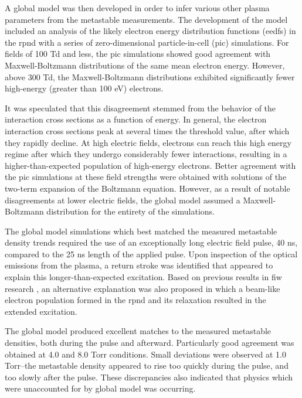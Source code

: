 A global model was then developed in order to infer various other plasma
parameters from the metastable measurements. The development of the model
included an analysis of the likely electron energy distribution functions
(\acs{eedf}s) in the \acs{rpnd} with a series of zero-dimensional
particle-in-cell (\acs{pic}) simulations. For fields of 100 Td and less, the
\acs{pic} simulations showed good agreement with Maxwell-Boltzmann distributions
of the same mean electron energy. However, above 300 Td, the Maxwell-Boltzmann
distributions exhibited significantly fewer high-energy (greater than 100 eV)
electrons.

It was speculated that this disagreement stemmed from the behavior of the
interaction cross sections as a function of energy. In general, the electron
interaction cross sections peak at several times the threshold value, after
which they rapidly decline. At high electric fields, electrons can reach this
high energy regime after which they undergo considerably fewer interactions,
resulting in a higher-than-expected population of high-energy electrons. Better
agreement with the \acs{pic} simulations at these field strengths were obtained
with solutions of the two-term expansion of the Boltzmann equation. However, as
a result of notable disagreements at lower electric fields, the global model
assumed a Maxwell-Boltzmann distribution for the entirety of the simulations.

The global model simulations which best matched the measured metastable density
trends required the use of an exceptionally long electric field pulse, 40 ns,
compared to the 25 ns length of the applied pulse. Upon inspection of the
optical emissions from the plasma, a return stroke was identified that appeared
to explain this longer-than-expected excitation. Based on previous results in
\acs{fiw} research \cite{Starikovskaia1998, Starikovskaia2011}, an alternative
explanation was also proposed in which a beam-like electron population formed in
the \acs{rpnd} and its relaxation resulted in the extended excitation.

The global model produced excellent matches to the measured metastable
densities, both during the pulse and afterward. Particularly good agreement was
obtained at 4.0 and 8.0 Torr conditions. Small deviations were observed at 1.0
Torr--the metastable density appeared to rise too quickly during the pulse, and
too slowly after the pulse. These discrepancies also indicated that physics
which were unaccounted for by global model was occurring.

